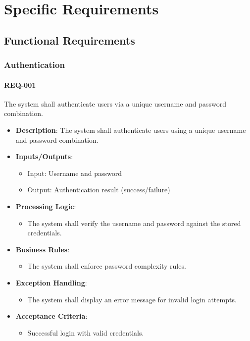 \documentclass{article}
\begin{document}
\section{Specific Requirements}
\label{sec:specific-requirements}

\subsection{Functional Requirements}

\subsubsection{Authentication}

\paragraph{REQ-001}
The system shall authenticate users via a unique username and password combination.

\begin{itemize}
 \item \textbf{Description}: The system shall authenticate users using a unique username and password combination.
 \item \textbf{Inputs/Outputs}:
 \begin{itemize}
 \item Input: Username and password
 \item Output: Authentication result (success/failure)
 \end{itemize}
 \item \textbf{Processing Logic}:
 \begin{itemize}
 \item The system shall verify the username and password against the stored credentials.
 \end{itemize}
 \item \textbf{Business Rules}:
 \begin{itemize}
 \item The system shall enforce password complexity rules.
 \end{itemize}
 \item \textbf{Exception Handling}:
 \begin{itemize}
 \item The system shall display an error message for invalid login attempts.
 \end{itemize}
 \item \textbf{Acceptance Criteria}:
 \begin{itemize}
 \item Successful login with valid credentials.
 \end{itemize}
\end{itemize}
\end{document}
